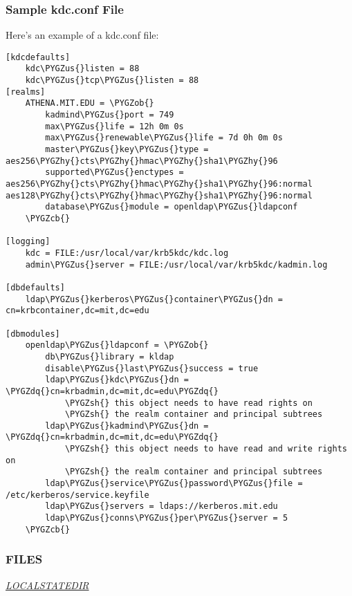 \documentclass[letterpaper,10pt,english]{sphinxmanual}
\def\PYGZus{\char`\_}
\def\PYGZob{\char`\{}
\def\PYGZcb{\char`\}}
\def\PYGZsh{\char`\#}
\def\PYGZhy{\char`\-}
\def\PYGZdq{\char`\"}
\begin{document}
\subsubsection{Sample kdc.conf File}
\label{admin/conf_files/kdc_conf:sample-kdc-conf-file}
Here's an example of a kdc.conf file:

\begin{Verbatim}[commandchars=\\\{\}]
[kdcdefaults]
    kdc\PYGZus{}listen = 88
    kdc\PYGZus{}tcp\PYGZus{}listen = 88
[realms]
    ATHENA.MIT.EDU = \PYGZob{}
        kadmind\PYGZus{}port = 749
        max\PYGZus{}life = 12h 0m 0s
        max\PYGZus{}renewable\PYGZus{}life = 7d 0h 0m 0s
        master\PYGZus{}key\PYGZus{}type = aes256\PYGZhy{}cts\PYGZhy{}hmac\PYGZhy{}sha1\PYGZhy{}96
        supported\PYGZus{}enctypes = aes256\PYGZhy{}cts\PYGZhy{}hmac\PYGZhy{}sha1\PYGZhy{}96:normal aes128\PYGZhy{}cts\PYGZhy{}hmac\PYGZhy{}sha1\PYGZhy{}96:normal
        database\PYGZus{}module = openldap\PYGZus{}ldapconf
    \PYGZcb{}

[logging]
    kdc = FILE:/usr/local/var/krb5kdc/kdc.log
    admin\PYGZus{}server = FILE:/usr/local/var/krb5kdc/kadmin.log

[dbdefaults]
    ldap\PYGZus{}kerberos\PYGZus{}container\PYGZus{}dn = cn=krbcontainer,dc=mit,dc=edu

[dbmodules]
    openldap\PYGZus{}ldapconf = \PYGZob{}
        db\PYGZus{}library = kldap
        disable\PYGZus{}last\PYGZus{}success = true
        ldap\PYGZus{}kdc\PYGZus{}dn = \PYGZdq{}cn=krbadmin,dc=mit,dc=edu\PYGZdq{}
            \PYGZsh{} this object needs to have read rights on
            \PYGZsh{} the realm container and principal subtrees
        ldap\PYGZus{}kadmind\PYGZus{}dn = \PYGZdq{}cn=krbadmin,dc=mit,dc=edu\PYGZdq{}
            \PYGZsh{} this object needs to have read and write rights on
            \PYGZsh{} the realm container and principal subtrees
        ldap\PYGZus{}service\PYGZus{}password\PYGZus{}file = /etc/kerberos/service.keyfile
        ldap\PYGZus{}servers = ldaps://kerberos.mit.edu
        ldap\PYGZus{}conns\PYGZus{}per\PYGZus{}server = 5
    \PYGZcb{}
\end{Verbatim}


\subsubsection{FILES}
\label{admin/conf_files/kdc_conf:files}
{\hyperref[mitK5defaults:paths]{\emph{LOCALSTATEDIR}}}
\end{document}
